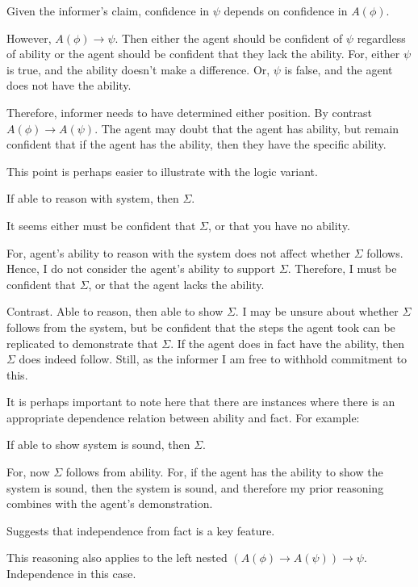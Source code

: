\documentclass[10pt]{article}
\newcommand{\hozlinedash}[0]{%
  \noindent\hdashrule[0.5ex][c]{\textwidth}{.1pt}{2.5pt}
}
\begin{document}
Given the informer's claim, confidence in \(\psi\) depends on confidence in \(A(\phi)\).

However, \(A(\phi) \rightarrow \psi\).
Then either the agent should be confident of \(\psi\) regardless of ability or the agent should be confident that they lack the ability.
For, either \(\psi\) is true, and the ability doesn't make a difference.
Or, \(\psi\) is false, and the agent does not have the ability.

Therefore, informer needs to have determined either position.
By contrast \(A(\phi) \rightarrow A(\psi)\).
The agent may doubt that the agent has ability, but remain confident that if the agent has the ability, then they have the specific ability.

This point is perhaps easier to illustrate with the logic variant.

If able to reason with system, then \(\Sigma\).

It seems either must be confident that \(\Sigma\), or that you have no ability.

For, agent's ability to reason with the system does not affect whether \(\Sigma\) follows.
Hence, I do not consider the agent's ability to support \(\Sigma\).
Therefore, I must be confident that \(\Sigma\), or that the agent lacks the ability.

Contrast.
Able to reason, then able to show \(\Sigma\).
I may be unsure about whether \(\Sigma\) follows from the system, but be confident that the steps the agent took can be replicated to demonstrate that \(\Sigma\).
If the agent does in fact have the ability, then \(\Sigma\) does indeed follow.
Still, as the informer I am free to withhold commitment to this.

It is perhaps important to note here that there are instances where there is an appropriate dependence relation between ability and fact.
For example:

If able to show system is sound, then \(\Sigma\).

For, now \(\Sigma\) follows from ability.
For, if the agent has the ability to show the system is sound, then the system is sound, and therefore my prior reasoning combines with the agent's demonstration.

Suggests that independence from fact is a key feature.

\hozlinedash

This reasoning also applies to the left nested \((A(\phi) \rightarrow A(\psi)) \rightarrow \psi\).
Independence in this case.
\end{document}

